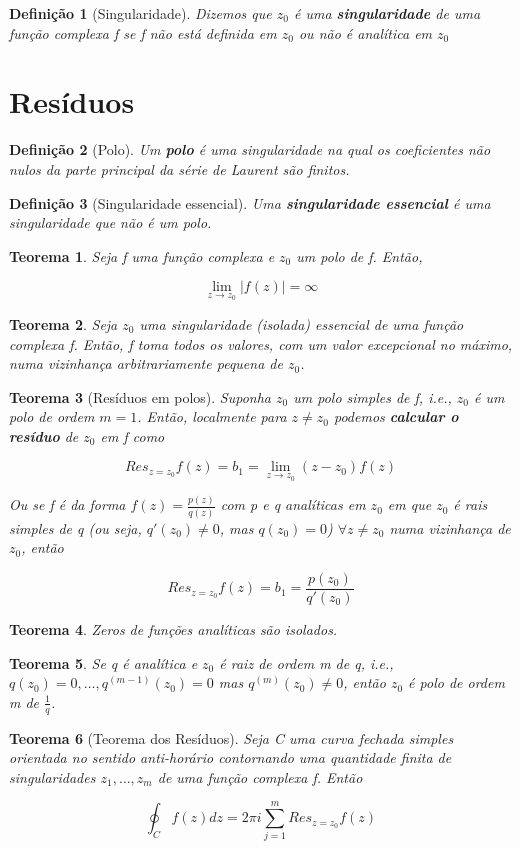 \documentclass{article}
\newtheorem{theorem}{Teorema}
\newtheorem{definition}{Definição}
\begin{document}
\begin{definition}[Singularidade]
Dizemos que $z_0$ é uma \textbf{singularidade} de uma função complexa f se f não está definida em $z_0$ ou não é analítica em $z_0$
\end{definition}

\section*{Resíduos}
\label{s9}
\begin{definition}[Polo]
Um \textbf{polo} é uma singularidade na qual os coeficientes não nulos da parte principal da série de Laurent são finitos.
\end{definition}

\begin{definition}[Singularidade essencial] Uma \textbf{singularidade essencial} é uma singularidade que não é um polo.
\end{definition}

\begin{theorem}
Seja f uma função complexa e $z_0$ um polo de f. Então,

$$\lim_{z \rightarrow z_0} |f(z)| = \infty$$
\end{theorem}

\begin{theorem}
Seja $z_0$ uma singularidade (isolada) essencial de uma função complexa f. Então, f toma todos os valores, com um valor excepcional no máximo, numa vizinhança arbitrariamente pequena de $z_0$.
\end{theorem}

\begin{theorem}[Resíduos em polos]
Suponha $z_0$ um polo simples de f, i.e., $z_0$ é um polo de ordem $m=1$. Então, localmente para $z \neq z_0$ podemos \textbf{calcular o resíduo} de $z_0$ em f como

$$Res_{z = z_0} f(z) = b_1 = \lim_{z \rightarrow z_0} (z - z_0) f(z)$$

Ou se f é da forma $f(z) = \frac{p(z)}{q(z)}$ com p e q analíticas em $z_0$ em que $z_0$ é rais simples de q (ou seja, $q'(z_0) \neq 0$, mas $q(z_0) = 0$) $\forall z \neq z_0$ numa vizinhança de $z_0$, então

$$Res_{z = z_0} f(z) = b_1 = \frac{p(z_0)}{q'(z_0)}$$
\end{theorem}

\begin{theorem}
Zeros de funções analíticas são isolados.
\end{theorem}

\begin{theorem}
Se q é analítica e $z_0$ é raiz de ordem m de q, i.e., $q(z_0) = 0, \ldots, q^{(m - 1)}(z_0) = 0$ mas $q^{(m)}(z_0) \neq 0$, então $z_0$ é polo de ordem m de $\frac{1}{q}$.
\end{theorem}

\begin{theorem}[Teorema dos Resíduos]
Seja C uma curva fechada simples orientada no sentido anti-horário contornando uma quantidade finita de singularidades $z_1, \ldots, z_m$ de uma função complexa f. Então

$$\oint_C f(z) d z = 2 \pi i \sum_{j = 1}^m Res_{z = z_0} f(z)$$
\end{theorem}
\end{document}
